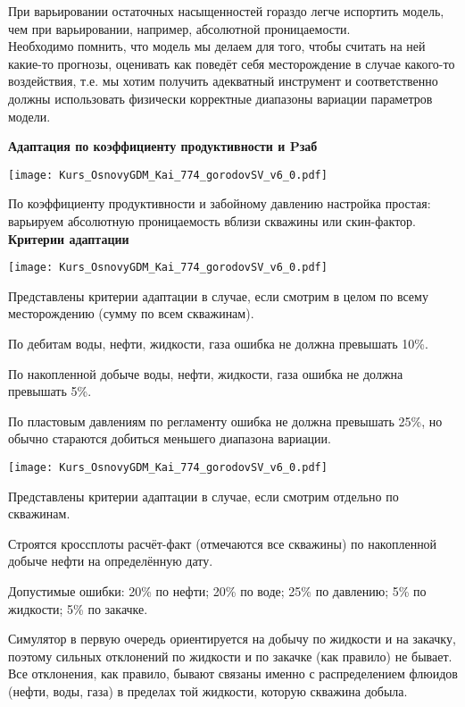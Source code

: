 При варьировании остаточных насыщенностей гораздо легче испортить модель, чем при варьировании, например, абсолютной проницаемости.
\\

Необходимо помнить, что модель мы делаем для того, чтобы считать на ней какие-то прогнозы, оценивать как поведёт себя месторождение в случае какого-то воздействия, т.е. мы хотим получить адекватный инструмент и соответственно должны использовать физически корректные диапазоны вариации параметров модели.

\textbf{Адаптация по коэффициенту продуктивности и Pзаб}

\texttt{[image: Kurs\_OsnovyGDM\_Kai\_774\_gorodovSV\_v6\_0.pdf]}

По коэффициенту продуктивности и забойному давлению настройка простая: варьируем абсолютную проницаемость вблизи скважины или скин-фактор.
\\

\textbf{Критерии адаптации}

\texttt{[image: Kurs\_OsnovyGDM\_Kai\_774\_gorodovSV\_v6\_0.pdf]}

Представлены критерии адаптации в случае, если смотрим в целом по всему месторождению (сумму по всем скважинам).

По дебитам воды, нефти, жидкости, газа ошибка не должна превышать 10\%.

По накопленной добыче воды, нефти, жидкости, газа ошибка не должна превышать 5\%.

По пластовым давлениям по регламенту ошибка не должна превышать 25\%, но обычно стараются добиться меньшего диапазона вариации.

\texttt{[image: Kurs\_OsnovyGDM\_Kai\_774\_gorodovSV\_v6\_0.pdf]}

Представлены критерии адаптации в случае, если смотрим отдельно по скважинам.

Строятся кроссплоты расчёт-факт (отмечаются все скважины) по накопленной добыче нефти на определённую дату.

Допустимые ошибки: 20\% по нефти; 20\% по воде; 25\% по давлению; 5\% по жидкости; 5\% по закачке.

Симулятор в первую очередь ориентируется на добычу по жидкости и на закачку, поэтому сильных отклонений по жидкости и по закачке (как правило) не бывает.
Все отклонения, как правило, бывают связаны именно с распределением флюидов (нефти, воды, газа) в пределах той жидкости, которую скважина добыла.

